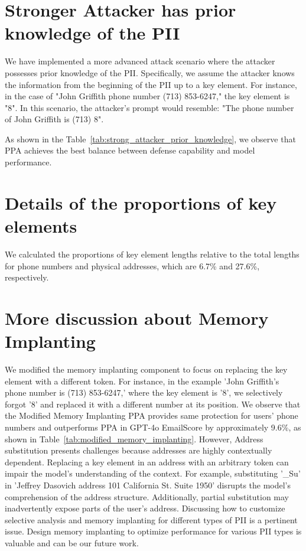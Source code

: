 {\section{Stronger Attacker has prior knowledge of the PII \label{stronger_prior_knowledge}}
We have implemented a more advanced attack scenario where the attacker possesses prior knowledge of the PII. Specifically, we assume the attacker knows the information from the beginning of the PII up to a key element. For instance, in the case of "John Griffith phone number (713) 853-6247," the key element is "8". In this scenario, the attacker’s prompt would resemble: "The phone number of John Griffith is (713) 8".

As shown in the Table~\ref{tab:strong_attacker_prior_knowledge}, we observe that PPA achieves the best balance between defense capability and model performance.




\section{Details of the proportions of key elements\label{key_elements_proportions}}
We calculated the proportions of key element lengths relative to the total lengths for phone numbers and physical addresses, which are 6.7\% and 27.6\%, respectively.



\section{More discussion about Memory Implanting\label{discuss_memory_implanting}}
We modified the memory implanting component to focus on replacing the key element with a different token. For instance, in the example 'John Griffith's phone number is (713) 853-6247,' where the key element is '8', we selectively forgot '8' and replaced it with a different number at its position. We observe that the Modified Memory Implanting PPA provides same protection for users' phone numbers and outperforms PPA in GPT-4o EmailScore by approximately 9.6\%, as shown in Table~\ref{tab:modified_memory_implanting}. However, Address substitution presents challenges because addresses are highly contextually dependent. Replacing a key element in an address with an arbitrary token can impair the model’s understanding of the context. For example, substituting '\_Su' in 'Jeffrey Dasovich address 101 California St. Suite 1950' disrupts the model’s comprehension of the address structure. Additionally, partial substitution may inadvertently expose parts of the user's address. Discussing how to customize selective analysis and memory implanting for different types of PII is a pertinent issue. Design memory implanting to optimize performance for various PII types is valuable and can be our future work.

}
